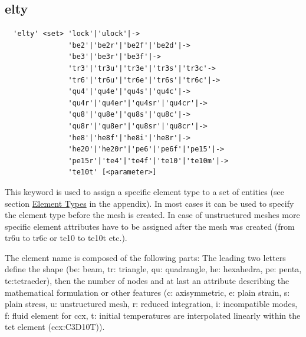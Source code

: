 \documentclass{article}
\providecommand{\htmlref}[2]{\hyperref[#2]{#1}}
\begin{document}
\subsection{\label{elty}elty}
\begin{verbatim}
  'elty' <set> 'lock'|'ulock'|->
               'be2'|'be2r'|'be2f'|'be2d'|->
               'be3'|'be3r'|'be3f'|->
               'tr3'|'tr3u'|'tr3e'|'tr3s'|'tr3c'->
               'tr6'|'tr6u'|'tr6e'|'tr6s'|'tr6c'|->
               'qu4'|'qu4e'|'qu4s'|'qu4c'|->
               'qu4r'|'qu4er'|'qu4sr'|'qu4cr'|->
               'qu8'|'qu8e'|'qu8s'|'qu8c'|->
               'qu8r'|'qu8er'|'qu8sr'|'qu8cr'|->
               'he8'|'he8f'|'he8i'|'he8r'|->
               'he20'|'he20r'|'pe6'|'pe6f'|'pe15'|->
               'pe15r'|'te4'|'te4f'|'te10'|'te10m'|->
               'te10t' [<parameter>]
\end{verbatim}
This keyword is used to assign a specific element type to a set of entities
(see section \htmlref{Element Types}{Element Types} in the appendix). In most
cases it can be used to specify the element type before the mesh is
created. In case of unstructured meshes more specific element attributes have to be assigned after the mesh was created (from tr6u to tr6c or te10 to te10t etc.). 

The element name is composed of the following parts: The leading two letters
define the shape (be: beam, tr: triangle, qu: quadrangle, he: hexahedra, pe:
penta, te:tetraeder), then the number of nodes and at last an attribute
describing the mathematical formulation or other features (c: axisymmetric, e: plain strain, s: plain
stress, u: unstructured mesh, r: reduced integration, i: incompatible modes,
f: fluid element for ccx, t: initial temperatures are interpolated linearly
within the tet element (ccx:C3D10T)).
\end{document}
